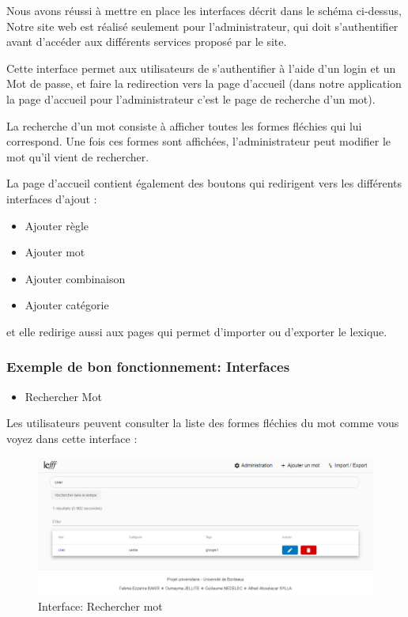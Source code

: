 \documentclass[12pt,a4paper]{article}
\begin{document}
Nous avons réussi à mettre en place les interfaces décrit dans le schéma ci-dessus,
Notre site web est réalisé seulement pour l'administrateur, qui doit s'authentifier
avant d'accéder aux différents services proposé par le site.

Cette interface permet aux utilisateurs de s'authentifier à l’aide d'un login et un Mot de passe, 
et faire la redirection vers la page d'accueil (dans notre application la page d'accueil
pour l'administrateur c'est le page de recherche d'un mot).

La recherche d'un mot consiste à afficher toutes les formes fléchies qui lui correspond. Une fois ces formes sont affichées, 
l'administrateur peut modifier le mot qu'il vient de rechercher.

La page d'accueil contient également des boutons qui redirigent vers les différents interfaces d'ajout : 
\begin{itemize}
    \item   Ajouter règle
    \item   Ajouter mot
    \item   Ajouter combinaison
    \item   Ajouter catégorie
   \end{itemize}
et elle redirige aussi aux  pages qui permet d'importer ou d'exporter le lexique.


\subsubsection{Exemple de bon fonctionnement: Interfaces} 

\begin{itemize}  
  \item Rechercher Mot
\end{itemize}
Les utilisateurs peuvent consulter la liste des formes fléchies du mot comme vous voyez dans cette interface :


\begin{figure}[!b]
\centering
\includegraphics{img/Recherche.PNG}
\caption{Interface: Rechercher mot}
\label{Tux}
\end{figure}
\end{document}
